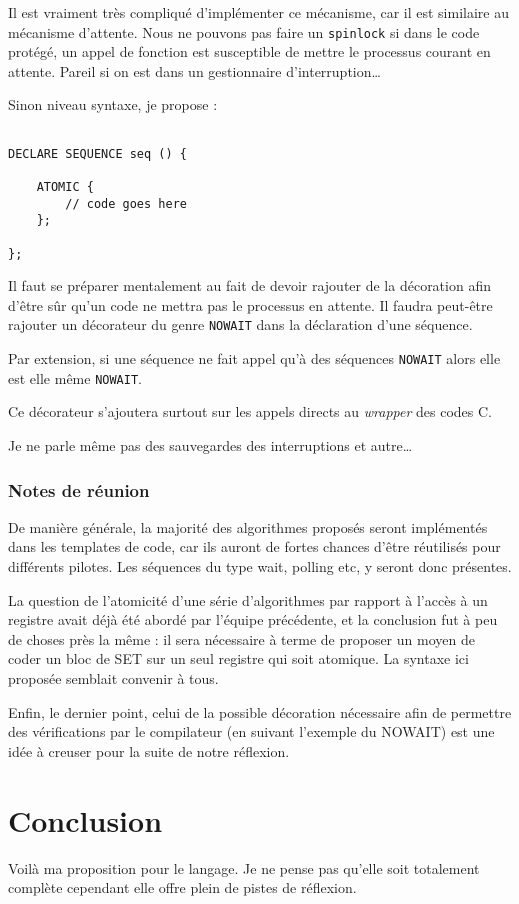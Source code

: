\documentclass{rtxreport}
\begin{document}
Il est vraiment très compliqué d’implémenter ce mécanisme, car il est similaire
au mécanisme d’attente. Nous ne pouvons pas faire un \texttt{spinlock} si dans
le code protégé, un appel de fonction est susceptible de mettre le processus
courant en attente. Pareil si on est dans un gestionnaire d’interruption\ldots

Sinon niveau syntaxe, je propose :
\begin{lstlisting}

DECLARE SEQUENCE seq () {

	ATOMIC {
		// code goes here
	};

};

\end{lstlisting}

Il faut se préparer mentalement au fait de devoir rajouter de la décoration
afin d’être sûr qu’un code ne mettra pas le processus en attente. Il faudra
peut-être rajouter un décorateur du genre \texttt{NOWAIT} dans la déclaration
d’une séquence.

Par extension, si une séquence ne fait appel qu’à des séquences \texttt{NOWAIT}
alors elle est elle même \texttt{NOWAIT}.

Ce décorateur s’ajoutera surtout sur les appels directs au \emph{wrapper} des
codes C.

Je ne parle même pas des sauvegardes des interruptions et autre\ldots

\subsection{Notes de réunion}
De manière générale, la majorité des algorithmes proposés seront implémentés
dans les templates de code, car ils auront de fortes chances d'être réutilisés
pour différents pilotes. Les séquences du type wait, polling etc, y seront
donc présentes.

La question de l'atomicité d'une série d'algorithmes par rapport à l'accès à
un registre avait déjà été abordé par l'équipe précédente, et la conclusion fut
à peu de choses près la même : il sera nécessaire à terme de proposer un moyen
de coder un bloc de SET sur un seul registre qui soit atomique. La syntaxe ici
proposée semblait convenir à tous.

Enfin, le dernier point, celui de la possible décoration nécessaire afin de
permettre des vérifications par le compilateur (en suivant l'exemple du NOWAIT)
est une idée à creuser pour la suite de notre réflexion.


\chapter{Conclusion}
Voilà ma proposition pour le langage. Je ne pense pas qu’elle soit totalement
complète cependant elle offre plein de pistes de réflexion.
\end{document}
